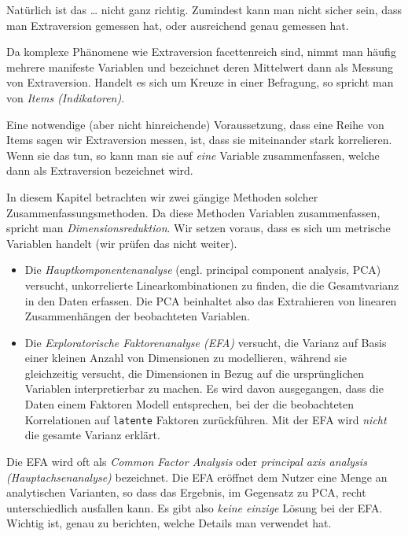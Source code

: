\documentclass[12pt,ngerman,]{book}
\providecommand{\tightlist}{%
  \setlength{\itemsep}{0pt}\setlength{\parskip}{0pt}}
\theoremstyle{definition}
\theoremstyle{definition}
\theoremstyle{remark}
\begin{document}
Natürlich ist das \ldots{} nicht ganz richtig. Zumindest kann man nicht
sicher sein, dass man Extraversion gemessen hat, oder ausreichend genau
gemessen hat.

Da komplexe Phänomene wie Extraversion facettenreich sind, nimmt man
häufig mehrere manifeste Variablen und bezeichnet deren Mittelwert dann
als Messung von Extraversion. Handelt es sich um Kreuze in einer
Befragung, so spricht man von \emph{Items (Indikatoren)}.

Eine notwendige (aber nicht hinreichende) Voraussetzung, dass eine Reihe
von Items sagen wir Extraversion messen, ist, dass sie miteinander stark
korrelieren. Wenn sie das tun, so kann man sie auf \emph{eine} Variable
zusammenfassen, welche dann als Extraversion bezeichnet wird.

In diesem Kapitel betrachten wir zwei gängige Methoden solcher
Zusammenfassungsmethoden. Da diese Methoden Variablen zusammenfassen,
spricht man \emph{Dimensionsreduktion}. Wir setzen voraus, dass es sich
um metrische Variablen handelt (wir prüfen das nicht weiter).

\begin{itemize}
\tightlist
\item
  Die \emph{Hauptkomponentenanalyse}
  (engl. principal component analysis, PCA) versucht, unkorrelierte
  Linearkombinationen zu finden, die die Gesamtvarianz in den Daten
  erfassen. Die PCA beinhaltet also das Extrahieren von
  linearen Zusammenhängen der beobachteten Variablen.
\item
  Die \emph{Exploratorische Faktorenanalyse
  (EFA)} versucht, die Varianz
  auf Basis einer kleinen Anzahl von Dimensionen zu modellieren, während
  sie gleichzeitig versucht, die Dimensionen in Bezug auf die
  ursprünglichen Variablen interpretierbar zu machen. Es wird davon
  ausgegangen, dass die Daten einem Faktoren Modell entsprechen, bei der
  die beobachteten Korrelationen auf \texttt{latente} Faktoren
  zurückführen. Mit der EFA wird \emph{nicht} die gesamte Varianz
  erklärt.
\end{itemize}

Die EFA wird oft als \emph{Common Factor Analysis} oder \emph{principal
axis analysis (Hauptachsenanalyse)}
bezeichnet. Die EFA eröffnet dem Nutzer eine
Menge an analytischen Varianten, so dass das Ergebnis, im Gegensatz zu
PCA, recht unterschiedlich ausfallen kann. Es gibt also \emph{keine
einzige} Lösung bei der EFA. Wichtig ist, genau zu berichten, welche
Details man verwendet hat.
\end{document}
